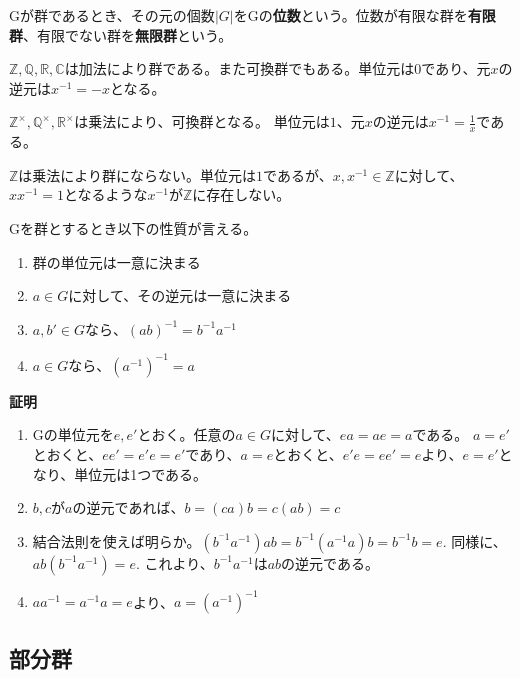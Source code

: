 \documentclass[dvipdfmx,autodetect-engine]{jsarticle}
\begin{document}

Gが群であるとき、その元の個数$|G|$をGの{\bf 位数}という。位数が有限な群を{\bf 有限群}、有限でない群を{\bf 無限群}という。

\exam $\mathbb{Z}, \mathbb{Q}, \mathbb{R}, \mathbb{C}$は加法により群である。また可換群でもある。単位元は$0$であり、元$x$の逆元は$x^{-1} = -x$となる。

\exam $\mathbb{Z}^×, \mathbb{Q}^×, \mathbb{R}^×$は乗法により、可換群となる。
単位元は$1$、元$x$の逆元は$x^{-1} = \frac{1}{x}$である。

\exam $\mathbb{Z}$は乗法により群にならない。単位元は$1$であるが、$x, x^{-1} \in \mathbb{Z}$に対して、$xx^{-1} = 1$となるような$x^{-1}$が$\mathbb{Z}$に存在しない。


\prop

Gを群とするとき以下の性質が言える。

\begin{enumerate}
\renewcommand{\labelenumi}{(\arabic{enumi})}
\item 群の単位元は一意に決まる
\item $a \in G$に対して、その逆元は一意に決まる
\item $a, b' \in G$なら、$(ab)^{-1} = b^{-1}a^{-1}$
\item $a \in G$なら、$(a^{-1})^{-1} = a$
\end{enumerate}

{\bf 証明}

\begin{enumerate}
\renewcommand{\labelenumi}{(\arabic{enumi})}
\item Gの単位元を$e, e'$とおく。任意の$a \in G$に対して、$ea = ae = a$である。
$a = e'$とおくと、$ee' = e'e = e'$であり、$a = e$とおくと、$e'e = ee' = e$より、$e = e'$となり、単位元は1つである。
\item $b, c$が$a$の逆元であれば、$b = (ca)b = c(ab) = c$
\item 結合法則を使えば明らか。$(b^{^-1}a^{-1})ab = b^{-1}(a^{-1}a)b = b^{-1}b = e$. 同様に、$ab(b^{-1}a^{-1}) = e$. これより、$b^{-1}a^{-1}$は$ab$の逆元である。
\item $aa^{-1} = a^{-1}a = e$より、$a = (a^{-1})^{-1}$

\end{enumerate}

\subsection{部分群}
\end{document}
